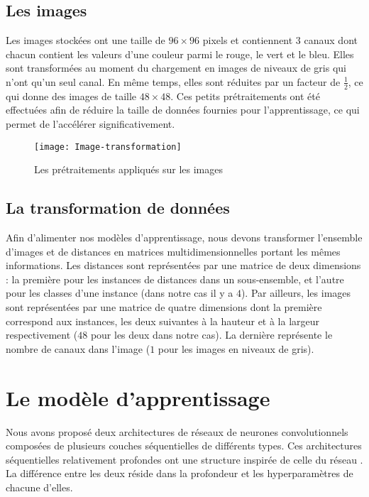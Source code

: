 \subsection{Les images}

Les images stockées ont une taille de $96 \times 96$ pixels et contiennent $3$
canaux dont chacun contient les valeurs d'une couleur parmi le rouge, le vert et
le bleu. Elles sont transformées au moment du chargement en images de niveaux
de gris qui n’ont qu’un seul canal. En même temps, elles sont réduites par un
facteur de $\frac{1}{2}$, ce qui donne des images de taille $48 \times 48$.
Ces petits prétraitements ont été effectuées afin de réduire la taille de données
fournies pour l'apprentissage, ce qui permet de l'accélérer significativement.

\begin{figure}[h]
\begin{center}
\texttt{[image: Image-transformation]}
\caption{Les prétraitements appliqués sur les images}
\end{center}
\end{figure}

\subsection{La transformation de données}

Afin d'alimenter nos modèles d'apprentissage, nous devons transformer l'ensemble
d'images et de distances en matrices multidimensionnelles portant les mêmes
informations. Les distances sont représentées par une matrice de deux dimensions :
la première pour les instances de distances dans un sous-ensemble, et l'autre pour
les classes d'une instance (dans notre cas il y a $4$). Par ailleurs, les images
sont représentées par une matrice de quatre dimensions dont la première correspond
aux instances, les deux suivantes à la hauteur et à la largeur
respectivement ($48$ pour les deux dans notre cas). La dernière représente le
nombre de canaux dans l'image ($1$ pour les images en niveaux de gris).

\section{Le modèle d'apprentissage}

Nous avons proposé deux architectures de réseaux de neurones convolutionnels composées
de plusieurs couches séquentielles de différents types. Ces architectures
séquentielles relativement profondes ont une structure inspirée de celle du
réseau  \cite{simonyan2014very}. La différence entre les deux
réside dans la profondeur et les hyperparamètres de chacune d'elles.

